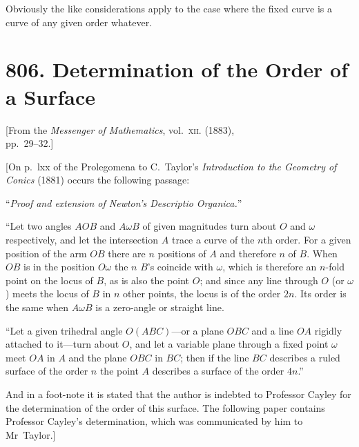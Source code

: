\documentclass[11pt,a4paper]{book}
\begin{document}
Obviously the like considerations apply to the case where the fixed curve is a curve of any given order whatever.


\newpage
\section*{806. Determination of the Order of a Surface}

\begin{center}
\small[From the \textit{Messenger of Mathematics}, vol.~\textsc{xii}. (1883),\\
pp.~29--32.]
\end{center}

\bigskip

[On p.~lxx of the Prolegomena to C.~Taylor's \textit{Introduction to the Geometry of Conics} (1881) occurs the following passage:

``\textit{Proof and extension of Newton's Descriptio Organica.}''

``Let two angles $AOB$ and $A\omega B$ of given magnitudes turn about $O$ and $\omega$ respectively, and let the intersection $A$ trace a curve of the $n$th order. For a given position of the arm $OB$ there are $n$ positions of $A$ and therefore $n$ of $B$. When $OB$ is in the position $O\omega$ the $n$ $B$'s coincide with $\omega$, which is therefore an $n$-fold point on the locus of $B$, as is also the point $O$; and since any line through $O$ (or $\omega$) meets the locus of $B$ in $n$ other points, the locus is of the order $2n$. Its order is the same when $A\omega B$ is a zero-angle or straight line.

``Let a given trihedral angle $O(ABC)$---or a plane $OBC$ and a line $OA$ rigidly attached to it---turn about $O$, and let a variable plane through a fixed point $\omega$ meet $OA$ in $A$ and the plane $OBC$ in $BC$; then if the line $BC$ describes a ruled surface of the order $n$ the point $A$ describes a surface of the order $4n$.''

And in a foot-note it is stated that the author is indebted to Professor Cayley for the determination of the order of this surface. The following paper contains Professor Cayley's determination, which was communicated by him to Mr~Taylor.]

\medskip
\end{document}
